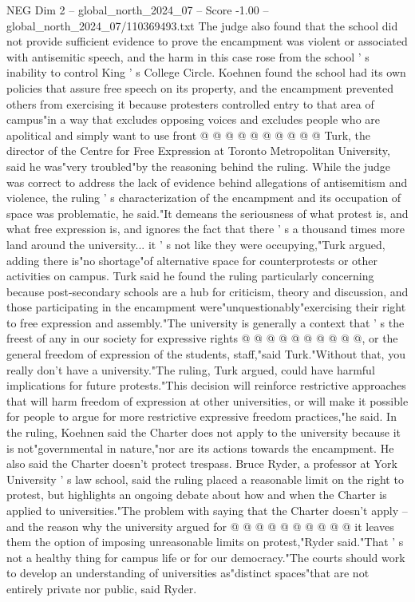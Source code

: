 \begin{textsample}{NEG Dim 2 – global\_north\_2024\_07 – Score -1.00 – global\_north\_2024\_07/110369493.txt}
The judge also found that the school did not provide sufficient evidence to prove the encampment was violent or associated with antisemitic speech, and the harm in this case rose from the school ' s inability to control King ' s College Circle.
Koehnen found the school had its own policies that assure free speech on its property, and the encampment prevented others from exercising it because protesters controlled entry to that area of campus"in a way that excludes opposing voices and excludes people who are apolitical and simply want to use front @ @ @ @ @ @ @ @ @ @ Turk, the director of the Centre for Free Expression at Toronto Metropolitan University, said he was"very troubled"by the reasoning behind the ruling.
While the judge was correct to address the lack of evidence behind allegations of antisemitism and violence, the ruling ' s characterization of the encampment and its occupation of space was problematic, he said."It demeans the seriousness of what protest is, and what free expression is, and ignores the fact that there ' s a thousand times more land around the university... it ' s not like they were occupying,"Turk argued, adding there is"no shortage"of alternative space for counterprotests or other activities on campus.
Turk said he found the ruling particularly concerning because post-secondary schools are a hub for criticism, theory and discussion, and those participating in the encampment were"unquestionably"exercising their right to free expression and assembly."The university is generally a context that ' s the freest of any in our society for expressive rights @ @ @ @ @ @ @ @ @ @, or the general freedom of expression of the students, staff,"said Turk."Without that, you really don't have a university."The ruling, Turk argued, could have harmful implications for future protests."This decision will reinforce restrictive approaches that will harm freedom of expression at other universities, or will make it possible for people to argue for more restrictive expressive freedom practices,"he said.
In the ruling, Koehnen said the Charter does not apply to the university because it is not"governmental in nature,"nor are its actions towards the encampment.
He also said the Charter doesn't protect trespass.
Bruce Ryder, a professor at York University ' s law school, said the ruling placed a reasonable limit on the right to protest, but highlights an ongoing debate about how and when the Charter is applied to universities."The problem with saying that the Charter doesn't apply -- and the reason why the university argued for @ @ @ @ @ @ @ @ @ @ it leaves them the option of imposing unreasonable limits on protest,"Ryder said."That ' s not a healthy thing for campus life or for our democracy."The courts should work to develop an understanding of universities as"distinct spaces"that are not entirely private nor public, said Ryder.

\end{textsample}
